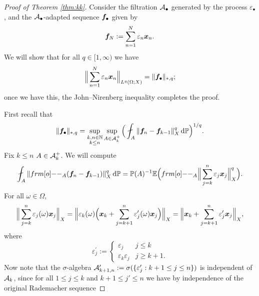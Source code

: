 \begin{proof}[Proof of Theorem \ref{thm:kk}]
  Consider the filtration $\mathcal{A}_{\bullet}$ generated by the process $\varepsilon_{\bullet}$, and the $\mathcal{A}_{\bullet}$-adapted sequence $\bm{f}_{\bullet}$ given by
  \begin{equation*}
    \bm{f}_{N} := \sum_{n=1}^N \varepsilon_n \bm{x}_{n}.
  \end{equation*}
  We will show that for all $q \in [1,\infty)$ we have
  \begin{equation}\label{eq:kk-claim}
    \Big\| \sum_{n=1}^N \varepsilon_n \bm{x}_n \Big\|_{L^q(\Omega;X)} = \|\bm{f}_{\bullet}\|_{*,q};
  \end{equation}
  once we have this, the John--Nirenberg inequality completes the proof.

  First recall that
  \begin{equation*}
    \|\mb{f}_{\bullet}\|_{*,q} =  \sup_{\substack{k,n \in \N \\ k \leq n}} \sup_{A \in \mc{A}_k^{+}} \Big( \fint_{A} \|\mb{f}_n - \mb{f}_{k-1}\|_{X}^{q} \, \dd\P\Big)^{1/q}.
  \end{equation*}
  Fix $k \leq n$ $A \in \mathcal{A}_k^{+}$.
  We will compute
  \begin{equation*}
    \fint_{A} \|\1_{A} (\mb{f}_n - \mb{f}_{k-1})\|_{X}^q \, \dd\P = \P(A)^{-1} \E \Big( \1_{A} \Big\| \sum_{j=k}^{n} \varepsilon_j \mb{x}_j\Big\|_{X}^q \Big).
  \end{equation*}
  For all $\omega \in \Omega$,
  \begin{equation*}
    \Big\| \sum_{j=k}^{n} \varepsilon_j(\omega) \bm{x}_j\Big\|_{X} = \Big\| \varepsilon_k(\omega) \Big( \bm{x}_k + \sum_{j=k+1}^{n} \varepsilon_{j}^{\prime}(\omega) \bm{x}_j \Big) \Big\|_{X} = \Big\|\bm{x}_k + \sum_{j=k+1}^{n} \varepsilon_{j}^{\prime} \bm{x}_j \Big\|_{X},
  \end{equation*}
  where
  \begin{equation*}
    \varepsilon_{j}^{\prime} :=
    \begin{cases}
      \varepsilon_{j} & j \leq k \\
      \varepsilon_{k} \varepsilon_{j} & j \geq k+1.
    \end{cases}
  \end{equation*}
  Now note that the $\sigma$-algebra $\mathcal{A}^\prime_{k+1,n} := \sigma(\{\varepsilon_j^\prime : k+1 \leq j \leq n\})$ is independent of $\mathcal{A}_k$, since for all $1 \leq j \leq k$ and $k+1 \leq j' \leq n$ we have by independence of the original Rademacher sequence

\end{proof}
